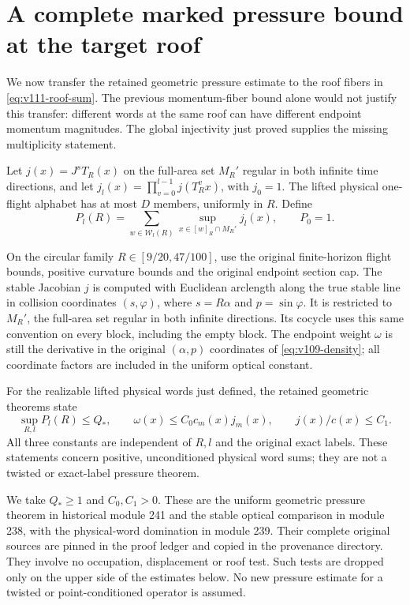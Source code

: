 \section{A complete marked pressure bound at the target roof}
\label{sec:v111-pressure}
We now transfer the retained geometric pressure estimate to the
roof fibers in \eqref{eq:v111-roof-sum}. The previous momentum-fiber
bound alone would not justify this transfer: different words at the
same roof can have different endpoint momentum magnitudes.
The global injectivity just proved supplies the missing multiplicity
statement.

Let $j(x)=J^sT_R(x)$ on the full-area set $M_R'$ regular in both
infinite time directions, and let $j_l(x)=\prod_{v=0}^{l-1}j(T_R^vx)$,
with $j_0=1$. The lifted physical one-flight alphabet has at most
$D$ members, uniformly in $R$. Define
\[
 P_l(R)=\sum_{w\in\mathcal W_l(R)}
                      \sup_{x\in[w]_R\cap M_R'}j_l(x),\qquad P_0=1.
\]
\begin{inputstatement}
\label{input:v112-geometric-pressure}
On the circular family $R\in[9/20,47/100]$, use the original
finite-horizon flight bounds, positive curvature bounds and the
original endpoint section cap. The stable Jacobian $j$ is computed
with Euclidean arclength along the true stable line in collision
coordinates $(s,\varphi)$, where $s=R\alpha$ and $p=\sin\varphi$.
It is restricted to $M_R'$, the full-area set regular in both
infinite directions. Its cocycle uses this same convention on every
block, including the empty block. The endpoint weight $\omega$ is
still the derivative in the original $(\alpha,p)$ coordinates of
\eqref{eq:v109-density}; all coordinate factors are included in the
uniform optical constant.

For the realizable lifted physical words just defined, the retained
geometric theorems state
\begin{equation}\label{eq:v111-pressure-input}
 \sup_{R,l}P_l(R)\le Q_*,\qquad
 \omega(x)\le C_0c_m(x)j_m(x),\qquad j(x)/c(x)\le C_1.
\end{equation}
All three constants are independent of $R,l$ and the original exact
labels. These statements concern positive, unconditioned physical
word sums; they are not a twisted or exact-label pressure theorem.
\end{inputstatement}
We take $Q_*\ge1$ and $C_0,C_1>0$. These are the uniform geometric
pressure theorem in historical module 241 and the stable optical
comparison in module 238, with the physical-word domination in
module 239. Their complete original sources are pinned in the proof
ledger and copied in the provenance directory. They involve no
occupation, displacement or roof test. Such tests are dropped only
on the upper side of the estimates below. No new pressure estimate
for a twisted or point-conditioned operator is assumed.

